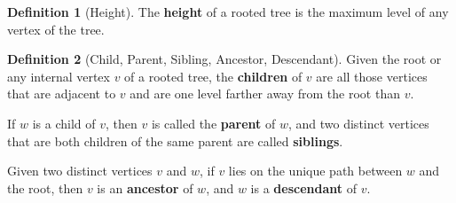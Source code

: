 \documentclass{article}
\theoremstyle{plain}
\theoremstyle{definition}
\newtheorem*{definition}{Definition}
\theoremstyle{remark}
\begin{document}
\begin{definition}[Height]
    The \textbf{height} of a rooted tree is the maximum level of any vertex of the tree.
\end{definition}

\begin{definition}[Child, Parent, Sibling, Ancestor, Descendant]
    Given the root or any internal vertex $v$ of a rooted tree, the \textbf{children} of $v$ are all those vertices that are adjacent to $v$ and are one level farther away from the root than $v$. 
    
    If $w$ is a child of $v$, then $v$ is called the \textbf{parent} of $w$, and two distinct vertices that are both children of the same parent are called \textbf{siblings}. 
    
    Given two distinct vertices $v$ and $w$, if $v$ lies on the unique path between $w$ and the root, then $v$ is an \textbf{ancestor} of $w$, and $w$ is a \textbf{descendant} of $v$.
\end{definition}
\end{document}
